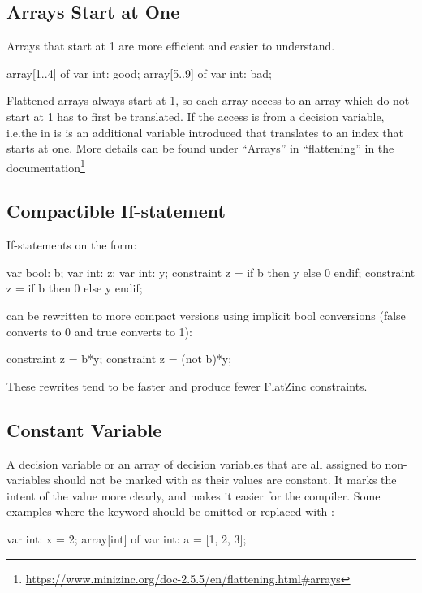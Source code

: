 \documentclass[a4paper,12pt]{article}
\newcommand{\mi}[1]{\mbox{\mzninline{#1}}}
\begin{document}
\subsection{Arrays Start at One}\label{sec:rule:arrayatone}
Arrays that start at 1 are more efficient and easier to understand.
\begin{mznnobreak}
array[1..4] of var int: good;
array[5..9] of var int: bad;
\end{mznnobreak}
Flattened arrays always start at 1, so each array access to an array which do not start at
1 has to first be translated. If the access is from a decision variable, i.e.\@ the \mi{i} in \mi{a[i]} is
\mi{var} is an additional variable introduced that translates \mi{i} to an index that
starts at one. More details can be found under ``Arrays'' in ``flattening'' in the
documentation\footnote{\url{https://www.minizinc.org/doc-2.5.5/en/flattening.html\#arrays}}

\subsection{Compactible If-statement}\label{sec:rule:compactif}
If-statements on the form:

\begin{mznnobreak}
var bool: b; var int: z; var int: y;
constraint z = if b then y else 0 endif;
constraint z = if b then 0 else y endif;
\end{mznnobreak}

can be rewritten to more compact versions using implicit bool conversions (false converts
to 0 and true converts to 1):

\begin{mznnobreak}
constraint z = b*y;
constraint z = (not b)*y;
\end{mznnobreak}

These rewrites tend to be faster and produce fewer FlatZinc constraints.

\subsection{Constant Variable}\label{sec:rule:constvar}
A decision variable or an array of decision variables that are all assigned to non-variables should not be
marked with \mi{var} as their values are constant. It marks the intent of the value more
clearly, and makes it easier for the compiler. Some examples where the keyword \mi{var}
should be omitted or replaced with \mi{par}:

\begin{mznnobreak}
var int: x = 2;
array[int] of var int: a = [1, 2, 3];
\end{mznnobreak}
\end{document}
